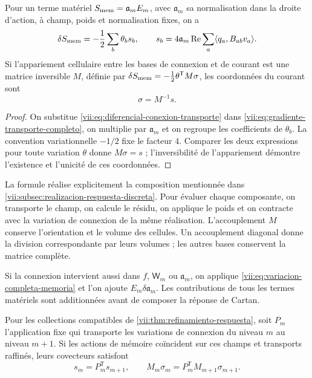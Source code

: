 \begin{theorem}
\label{vii:thm:corriente-conexion-evaluada}
Pour un terme matériel \(S_{\rm mem}=\mathfrak a_m E_m\), avec \(\mathfrak a_m\) sa normalisation dans la droite d'action, à champ, poids et normalisation fixes, on a
\begin{equation}
 \delta S_{\rm mem}=-\frac12\sum_b\theta_b s_b,\qquad
 s_b=4\mathfrak a_m\operatorname{Re}
        \sum_a\langle q_a,B_{ab}v_a\rangle.
 \label{vii:eq:componentes-corriente-conexion}
\end{equation}
Si l'appariement cellulaire entre les bases de connexion et de courant
est une matrice inversible \(M\), définie par
\(\delta S_{\rm mem}=-\tfrac12\theta^{\mathsf T}M\sigma\),
les coordonnées du courant sont
\begin{equation}
 \sigma=M^{-1}s.
 \label{vii:eq:coordenadas-corriente-material}
\end{equation}
\end{theorem}

\begin{proof}
On substitue \eqref{vii:eq:diferencial-conexion-transporte} dans
\eqref{vii:eq:gradiente-transporte-completo}, on multiplie par
\(\mathfrak a_m\) et on regroupe les coefficients de
\(\theta_b\). La convention variationnelle \(-1/2\) fixe le
facteur \(4\). Comparer les deux expressions pour toute variation
\(\theta\) donne \(M\sigma=s\) ; l'inversibilité de
l'appariement démontre l'existence et l'unicité de ces coordonnées.
\end{proof}

La formule réalise explicitement la composition mentionnée dans \ref{vii:subsec:realizacion-respuesta-discreta}. Pour évaluer chaque composante, on transporte le champ, on calcule le résidu, on applique le poids et on contracte avec la variation de connexion de la même réalisation. L'accouplement \(M\) conserve l'orientation et le volume des cellules. Un accouplement diagonal donne la division correspondante par leurs volumes ; les autres bases conservent la matrice complète.

Si la connexion intervient aussi dans \(f\), \(\mathsf W_m\)
ou \(\mathfrak a_m\), on applique
\eqref{vii:eq:variacion-completa-memoria} et l'on ajoute
\(E_m\delta\mathfrak a_m\). Les contributions de tous les
termes matériels sont additionnées avant de composer la réponse de Cartan.

\begin{corollary}
\label{vii:cor:refinamiento-corriente-conexion}
Pour les collections compatibles de \ref{vii:thm:refinamiento-respuesta}, soit \(P_m\) l'application fixe qui transporte les variations de connexion du niveau \(m\) au niveau \(m+1\). Si les actions de mémoire coïncident sur ces champs et transports raffinés, leurs covecteurs satisfont
\[
 s_m=P_m^{\mathsf T}s_{m+1},\qquad
 M_m\sigma_m=P_m^{\mathsf T}M_{m+1}\sigma_{m+1}.
\]
\end{corollary}

